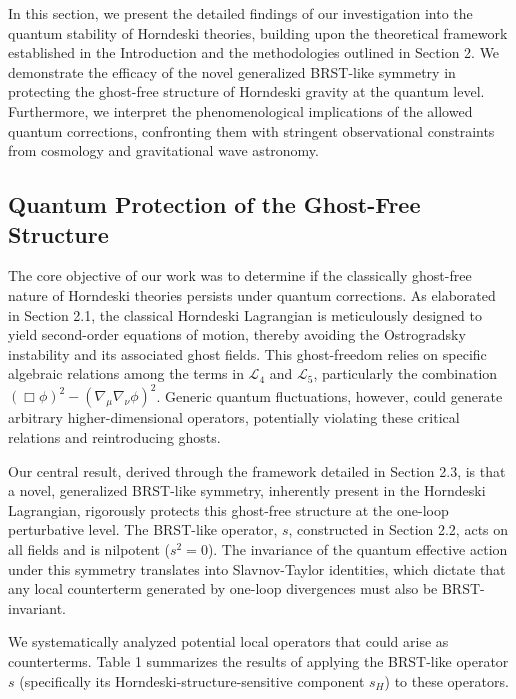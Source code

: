 \documentclass[twocolumn]{aastex631}
\begin{document}
In this section, we present the detailed findings of our investigation into the quantum stability of Horndeski theories, building upon the theoretical framework established in the Introduction and the methodologies outlined in Section 2. We demonstrate the efficacy of the novel generalized BRST-like symmetry in protecting the ghost-free structure of Horndeski gravity at the quantum level. Furthermore, we interpret the phenomenological implications of the allowed quantum corrections, confronting them with stringent observational constraints from cosmology and gravitational wave astronomy.

\subsection{Quantum Protection of the Ghost-Free Structure}
The core objective of our work was to determine if the classically ghost-free nature of Horndeski theories persists under quantum corrections. As elaborated in Section 2.1, the classical Horndeski Lagrangian is meticulously designed to yield second-order equations of motion, thereby avoiding the Ostrogradsky instability and its associated ghost fields. This ghost-freedom relies on specific algebraic relations among the terms in $\mathcal{L}_4$ and $\mathcal{L}_5$, particularly the combination $(\Box\phi)^2 - (\nabla_\mu\nabla_\nu\phi)^2$. Generic quantum fluctuations, however, could generate arbitrary higher-dimensional operators, potentially violating these critical relations and reintroducing ghosts.

Our central result, derived through the framework detailed in Section 2.3, is that a novel, generalized BRST-like symmetry, inherently present in the Horndeski Lagrangian, rigorously protects this ghost-free structure at the one-loop perturbative level. The BRST-like operator, $s$, constructed in Section 2.2, acts on all fields and is nilpotent ($s^2=0$). The invariance of the quantum effective action under this symmetry translates into Slavnov-Taylor identities, which dictate that any local counterterm generated by one-loop divergences must also be BRST-invariant.

We systematically analyzed potential local operators that could arise as counterterms. Table 1 summarizes the results of applying the BRST-like operator $s$ (specifically its Horndeski-structure-sensitive component $s_H$) to these operators.
\end{document}
